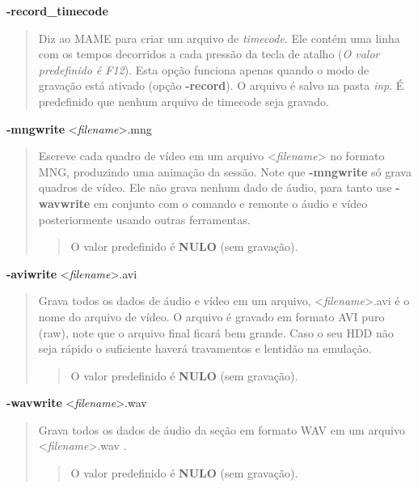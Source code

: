 \documentclass[letterpaper,10pt,brazil]{sphinxmanual}
\begin{document}
\label{commandline/commandline-all:mame-commandline-recordtimecode}
\textbf{-record\_timecode}
\begin{quote}

Diz ao MAME para criar um arquivo de \emph{timecode}. Ele contém uma linha
com os tempos decorridos a cada pressão da tecla de atalho
(\emph{O valor predefinido é F12}). Esta opção funciona apenas quando o modo de
gravação está ativado (opção \textbf{-record}). O arquivo é salvo na
pasta \emph{inp}. É predefinido que nenhum arquivo de timecode seja
gravado.
\end{quote}
\label{commandline/commandline-all:mame-commandline-mngwrite}
\textbf{-mngwrite} \textless{}\emph{filename}\textgreater{}.mng
\begin{quote}

Escreve cada quadro de vídeo em um arquivo \textless{}\emph{filename}\textgreater{} no formato
MNG, produzindo uma animação da sessão.
Note que \textbf{-mngwrite} só grava quadros de vídeo. Ele não grava
nenhum dado de áudio, para tanto use \textbf{-wavwrite} em conjunto com o
comando e remonte o áudio e vídeo posteriormente usando outras
ferramentas.
\begin{quote}

O valor predefinido é \textbf{NULO} (sem gravação).
\end{quote}
\end{quote}
\label{commandline/commandline-all:mame-commandline-aviwrite}
\textbf{-aviwrite} \textless{}\emph{filename}\textgreater{}.avi
\begin{quote}

Grava todos os dados de áudio e vídeo em um arquivo,
\textless{}\emph{filename}\textgreater{}.avi é o nome do arquivo de vídeo. O arquivo é gravado
em formato AVI puro (raw), note que o arquivo final ficará bem
grande. Caso o seu HDD não seja rápido o suficiente haverá
travamentos e lentidão na emulação.
\begin{quote}

O valor predefinido é \textbf{NULO} (sem gravação).
\end{quote}
\end{quote}
\label{commandline/commandline-all:mame-commandline-wavwrite}
\textbf{-wavwrite} \textless{}\emph{filename}\textgreater{}.wav
\begin{quote}

Grava todos os dados de áudio da seção em formato WAV em um arquivo
\textless{}\emph{filename}\textgreater{}.wav .
\begin{quote}

O valor predefinido é \textbf{NULO} (sem gravação).
\end{quote}
\end{quote}
\end{document}
